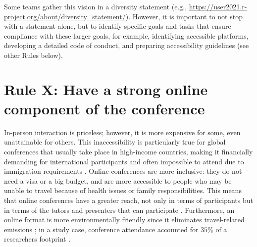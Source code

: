 \documentclass[10pt,letterpaper]{article}
\begin{document}
Some teams gather this vision in a diversity statement (e.g., \url{https://user2021.r-project.org/about/diversity_statement/}). %
However, it is important to not stop with a statement alone, but to identify specific goals and tasks that ensure compliance with these larger goals, for example, identifying accessible platforms, developing a detailed code of conduct, and preparing accessibility guidelines (see other Rules below).




\section{Rule X: Have a strong online component of the conference} 

In-person interaction is priceless; however, it is more expensive for some, even unattainable for others. This inaccessibility is particularly true for global conferences that usually take place in high-income countries, making it financially demanding for international participants and often impossible to attend due to immigration requirements \cite{arend_disparity_2019, gewin_what_2019}. Online conferences are more inclusive: they do not need a visa or a big budget, and are more accessible to people who may be unable to travel because of health issues or family responsibilities. This means that online conferences have a greater reach, not only in terms of participants but in terms of the tutors and presenters that can participate \cite{atkinson_r_medicine_2021}. Furthermore, an online format is more environmentally friendly since it eliminates travel-related emissions \cite{sarabipour_evaluating_2020, niner_better_2021}; in a study case, conference attendance accounted for $35\%$ of a researchers footprint .
\end{document}
